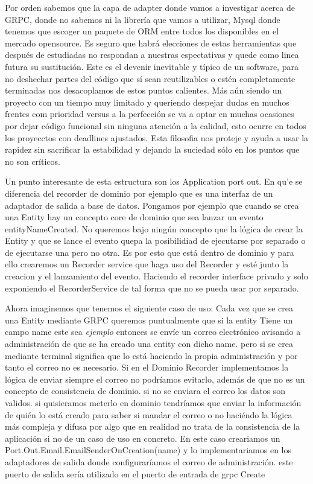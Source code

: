 Por orden sabemos que la capa de adapter donde vamos a investigar acerca de GRPC, donde no sabemos ni la librería que vamos a utilizar, Mysql donde tenemos que escoger un paquete de ORM entre todos los disponibles en el mercado opensource. Es seguro que habrá elecciones de estas herramientas que después de estudiadas no respondan a nuestras espectativas y quede como linea futura su sustitución. Este es el devenir inevitable y típico de un software, para no deshechar partes del código que sí sean reutilizables o estén completamente terminadas nos desacoplamos de estos puntos calientes. Más aún siendo un proyecto con un tiempo muy limitado y queriendo despejar dudas en muchos frentes com prioridad versus a la perfección se va a optar en muchas ocasiones por dejar código funcional sin ninguna atención a la calidad, esto ocurre en todos los proyecctos con deadlines ajustados. Esta filosofia nos proteje y ayuda a usar la rapidez sin sacrificar la estabilidad y dejando la suciedad sólo en los puntos que no son críticos.


Un punto interesante de esta estructura son los Application port out. En qu'e se diferencia del recorder de dominio por ejemplo que es una interfaz de un adaptador de salida a base de datos. Pongamos por ejemplo que cuando se crea una Entity hay un concepto core de dominio que sea lanzar un evento entityNameCreated. No queremos bajo ningún concepto que la lógica de crear la Entity y que se lance el evento quepa la posibilidiad de ejecutarse por separado o de ejecutarse una pero no otra. Es por esto que está dentro de dominio y para ello crearemos un Recorder service que haga uso del Recorder y esté junto la creacion y el lanzamiento del evento. Haciendo el recorder interface privado y solo exponiendo el RecorderService de tal forma que no se pueda usar por separado.

Ahora imaginemos que tenemos el siguiente caso de uso:
Cada vez que se crea una Entity mediante GRPC queremos puntualmente que si la entity Tiene un campo name este sea \textit{ejemplo} entonces se envíe un correo electrónico avisando a administración de que se ha creado una entity con dicho name.
pero si se crea mediante terminal significa que lo está haciendo la propia administración y por tanto el correo no es necesario. Si en el Dominio Recorder implementamos la lógica de enviar siempre el correo no podríamos evitarlo, además de que no es un concepto de consistencia de dominio. si no se enviara el correo los datos son validos. si quisieramos meterlo en dominio tendríamos que enviar la información de quién lo está creado para saber si mandar el correo o no haciéndo la lógica más compleja y difusa por algo que en realidad no trata de la consistencia de la aplicación si no de un caso de uso en concreto. En este caso creariamos un Port.Out.Email.EmailSenderOnCreation(name) y lo implementariamos en los adaptadores de salida donde configuraríamos el correo de administración. este puerto de salida sería utilizado en el puerto de entrada de grpc Create

\begin{figure}
    
    \caption{}
    \label{fig:ProjectfolderStructurePortOut}
\end{figure}

